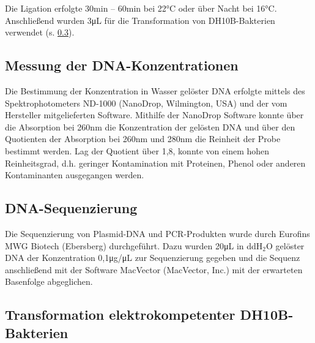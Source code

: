 Die Ligation erfolgte 30\si{\minute} -- 60\si{\minute} bei 22\si{\celsius} oder über Nacht bei 16\si{\celsius}. Anschließend wurden 3\si{\micro\liter} für die Transformation von DH10B-Bakterien verwendet (s. \ref{transformation}).

\subsection{Messung der DNA-Konzentrationen}
Die Bestimmung der Konzentration in Wasser gelöster DNA erfolgte mittels des Spektrophotometers ND-1000 (NanoDrop, Wilmington, USA) und der vom Hersteller mitgelieferten Software. Mithilfe der NanoDrop Software konnte über die Absorption bei 260\si{\nano\meter} die Konzentration der gelösten DNA und über den Quotienten der Absorption bei 260\si{\nano\meter} und 280\si{\nano\meter} die Reinheit der Probe bestimmt werden. Lag der Quotient über 1,8, konnte von einem hohen Reinheitsgrad, d.h. geringer Kontamination mit Proteinen, Phenol oder anderen Kontaminanten ausgegangen werden.

\subsection{DNA-Sequenzierung}
Die Sequenzierung von Plasmid-DNA und PCR-Produkten wurde durch Eurofins MWG Biotech (Ebersberg) durchgeführt. Dazu wurden 20\si{\micro\liter} in ddH$_2$O gelöster DNA der Konzentration 0,1\si{\micro\gram/\micro\liter} zur Sequenzierung gegeben und die Sequenz anschließend mit der Software MacVector (MacVector, Inc.) mit der erwarteten Basenfolge abgeglichen.

\subsection{Transformation elektrokompetenter DH10B-Bakterien} \label{transformation}

